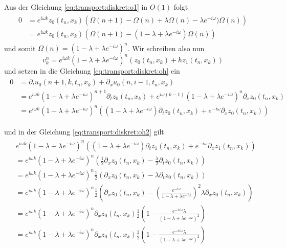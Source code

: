 Aus der Gleichung \eqref{eq:transport:diskret:o1} in $O(1)$ folgt
\begin{align} 
\begin{split}
0 &= e^{i \omega k} z_0(t_n, x_k) \left( \Omega(n+1) - \Omega(n) + \lambda \Omega(n) - \lambda e^{-i \omega}) \Omega(n) \right)\\
&= e^{i \omega k} z_0(t_n, x_k) \left(\Omega(n+1) - (1 - \lambda + \lambda e^{-i \omega}) \Omega(n) \right)
\end{split}
\end{align}
und somit $\Omega(n) = (1 - \lambda + \lambda e^{-i \omega})^n$. Wir schreiben also nun 
\[ 
v^n_k = e^{i \omega k} (1 - \lambda + \lambda e^{-i \omega})^n \left( z_0(t_n, x_k) + h z_1(t_n, x_k) \right)
\]
und setzen in die Gleichung \eqref{eq:transport:diskret:oh} ein
\begin{align}
\begin{split}
0 &= \partial_t u_0(n+1, k, t_n, x_k) + \partial_x u_0(n, i-1, t_n, x_k)\\
&= e^{i \omega k} (1 - \lambda + \lambda e^{-i \omega})^{n+1} \partial_t z_0(t_n, x_k) + e^{i \omega (k-1)} (1 - \lambda + \lambda e^{-i \omega})^n \partial_x z_0(t_n, x_k)\\
&= e^{i \omega k} (1 - \lambda + \lambda e^{-i \omega})^{n} \left( (1 - \lambda + \lambda e^{-i \omega}) \partial_t z_0(t_n, x_k) + e^{- i \omega} \partial_x z_0(t_n, x_k) \right)
\end{split}
\end{align}

und in der Gleichung \eqref{eq:transport:diskret:oh2} gilt
\begin{align}
\begin{split}
&e^{i \omega k} (1 - \lambda + \lambda e^{-i \omega})^{n} \left( (1 - \lambda + \lambda e^{-i \omega}) \partial_t z_1(t_n, x_k) + e^{- i \omega} \partial_x z_1(t_n, x_k) \right)\\
&= e^{i \omega k} (1 - \lambda + \lambda e^{-i \omega})^{n} \left( \frac{1}{2} \partial_x z_0(t_n, x_k) - \frac{\lambda}{2} \partial_t z_0(t_n, x_k) \right)\\
&= e^{i \omega k} (1 - \lambda + \lambda e^{-i \omega})^{n} \frac{1}{2} \left( \partial_x z_0(t_n, x_k) - \lambda \partial_t z_0(t_n, x_k) \right)\\
&= e^{i \omega k} (1 - \lambda + \lambda e^{-i \omega})^{n} \frac{1}{2} \left( \partial_x z_0(t_n, x_k) - \left( \frac{e^{- i \omega}}{1 - \lambda + \lambda e^{-i \omega}} \right)^2 \lambda \partial_x z_0(t_n, x_k) \right)\\
&= e^{i \omega k} (1 - \lambda + \lambda e^{-i \omega})^{n} \partial_x z_0(t_n, x_k) \frac{1}{2} \left( 1 - \frac{e^{- 2 i \omega} \lambda}{(1 - \lambda + \lambda e^{-i \omega})^2}  \right)\\
&= e^{i \omega k} (1 - \lambda + \lambda e^{-i \omega})^{n} \partial_x z_0(t_n, x_k) \frac{1}{2} \left( 1 - \frac{e^{- 2 i \omega} \lambda}{(1 - \lambda + \lambda e^{-i \omega})^2}  \right)\\
\end{split}
\end{align}

